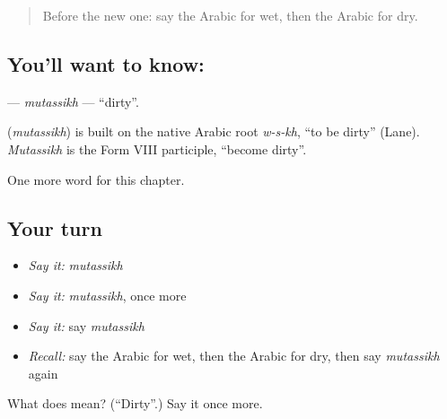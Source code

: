 \label{lesson:AR-C151-mutassikh}



\begin{quote}
Before the new one: say the Arabic for wet, then the Arabic for dry.
\end{quote}

\subsection*{You'll want to know: }
\textbf{} — \emph{mutassikh} — \textquotedblleft{}dirty\textquotedblright{}.

\begin{cousinweb}
\textbf{} (\emph{mutassikh}) is built on the native Arabic root \emph{w-s-kh}, \textquotedblleft{}to be dirty\textquotedblright{} (Lane). \emph{Mutassikh} is the Form VIII participle, \textquotedblleft{}become dirty\textquotedblright{}.
\end{cousinweb}

\begin{grammarlens}[title={What you've built}]
One more word for this chapter.
\end{grammarlens}

\subsection*{Your turn}
\begin{itemize}
\raggedright
  \item \emph{Say it:} \emph{mutassikh}
  \item \emph{Say it:} \emph{mutassikh}, once more
  \item \emph{Say it:} say \emph{mutassikh}
  \item \emph{Recall:} say the Arabic for wet, then the Arabic for dry, then say \emph{mutassikh} again
\end{itemize}

\begin{tcolorbox}[breakable,colback=teal!4,colframe=teal!35!black,title={Before you move on}]
What does  mean? (\textquotedblleft{}Dirty\textquotedblright{}.) Say it once more.
\end{tcolorbox}
